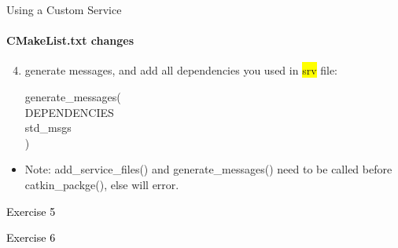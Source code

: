 \documentclass{beamer}
\begin{document}
\begin{frame}{Using a Custom Service}
    \framesubtitle{CMakeList.txt changes}
    
    \scriptsize
    \begin{enumerate}
        \setcounter{enumi}{3}
        \item generate messages, and add all dependencies you used in {\ttfamily \colorbox{yellow}{srv}} file:
        \begin{focus}
            \ttfamily \scriptsize
            generate\_messages(\\
            DEPENDENCIES\\
            std\_msgs\\
            )
        \end{focus}  
        
    \end{enumerate}
    
    \begin{itemize}
        \item Note: {\ttfamily \colorbox{gray!30!white}{add\_service\_files()}} and {\ttfamily \colorbox{gray!30!white}{generate\_messages()}} need to be called before {\ttfamily \colorbox{gray!30!white}{catkin\_packge()}}, else will error.
    \end{itemize}
    
\end{frame}

\begin{frame}[plain]{}  
    \centering
    {\huge \textcolor{black}{Exercise 5}}
\end{frame}


\begin{frame}[plain]{}  
    \centering
    {\huge \textcolor{black}{Exercise 6}}
\end{frame}
\end{document}
